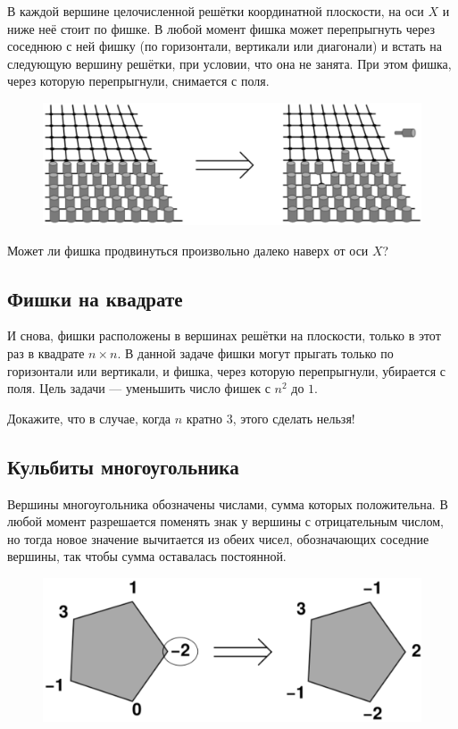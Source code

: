 В каждой вершине целочисленной решётки координатной плоскости, на оси $X$ и ниже неё стоит по фишке.
В любой момент фишка может перепрыгнуть через соседнюю с ней фишку (по горизонтали, вертикали или диагонали) и встать на следующую вершину решётки, при условии, что она не занята.
При этом фишка, через которую перепрыгнули, снимается с поля.

\begin{figure}[h!]
\centering
\includegraphics[scale=0.6]{Figs/Algorithms/pegs}
\end{figure}

Может ли фишка продвинуться произвольно далеко наверх от оси $X$?

\subsection*{Фишки на квадрате}%

И снова, фишки расположены в вершинах решётки на плоскости, только в этот раз в квадрате $n\times n$.
В данной задаче фишки могут прыгать только по горизонтали или вертикали, и фишка, через которую перепрыгнули, убирается с поля.
Цель задачи --- уменьшить число фишек с $n^2$ до $1$.

Докажите, что в случае, когда $n$ кратно $3$, этого сделать нельзя!

\subsection*{Кульбиты многоугольника}%

Вершины многоугольника обозначены числами, сумма которых положительна.
В любой момент разрешается поменять знак у вершины с отрицательным числом, но тогда новое значение вычитается из обеих чисел, обозначающих соседние вершины, так чтобы сумма оставалась постоянной.

\begin{figure}[h!]
\centering
\includegraphics[scale=0.6]{Figs/Algorithms/pent}
\end{figure}

